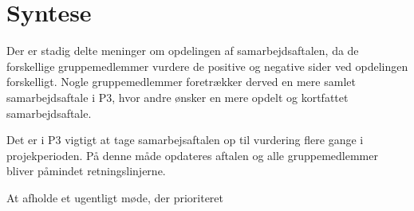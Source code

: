 \section{Syntese}
Der er stadig delte meninger om opdelingen af samarbejdsaftalen, da de forskellige gruppemedlemmer vurdere de positive og negative sider ved opdelingen forskelligt. Nogle gruppemedlemmer foretrækker derved en mere samlet samarbejdsaftale i P3, hvor andre ønsker en mere opdelt og kortfattet samarbejdsaftale.

Det er i P3 vigtigt at tage samarbejsaftalen op til vurdering flere gange i projekperioden. På denne måde opdateres aftalen og alle gruppemedlemmer bliver påmindet retningslinjerne. 

At afholde et ugentligt møde, der prioriteret